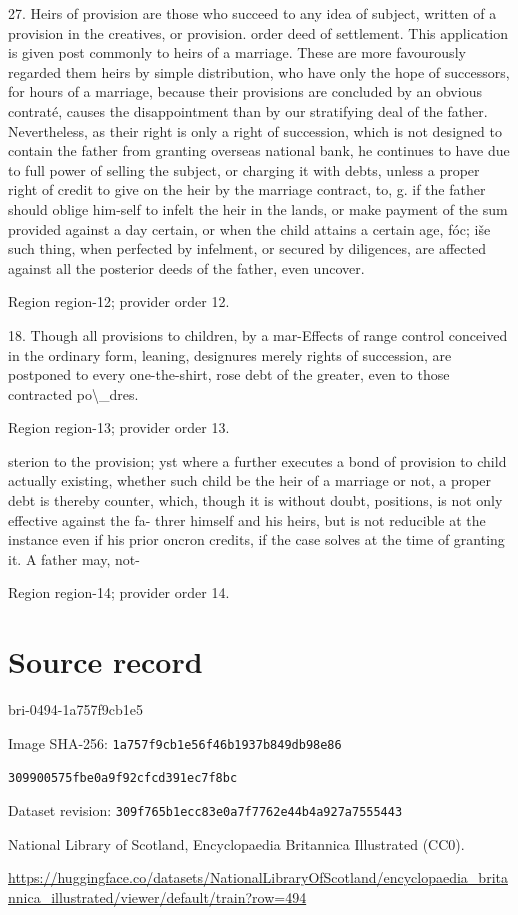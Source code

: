 \documentclass[11pt]{article}
\begin{document}
27. Heirs of provision are those who succeed to any idea of subject, written of a provision in the creatives, or provision. order deed of settlement. This application is given post commonly to heirs of a marriage. These are more favourously regarded them heirs by simple distribution, who have only the hope of successors, for hours of a marriage, because their provisions are concluded by an obvious contraté, causes the disappointment than by our stratifying deal of the father. Nevertheless, as their right is only a right of succession, which is not designed to contain the father from granting overseas national bank, he continues to have due to full power of selling the subject, or charging it with debts, unless a proper right of credit to give on the heir by the marriage contract, to, g. if the father should oblige him-self to infelt the heir in the lands, or make payment of the sum provided against a day certain, or when the child attains a certain age, fóc; iše such thing, when perfected by infelment, or secured by diligences, are affected against all the posterior deeds of the father, even uncover.
\par

{\scriptsize\color{gray} Region region-12; provider order 12.\par}
\medskip

18. Though all provisions to children, by a mar-Effects of range control conceived in the ordinary form, leaning, designures merely rights of succession, are postponed to every one-the-shirt, rose debt of the greater, even to those contracted po\textbackslash{}\_dres.
\par

{\scriptsize\color{gray} Region region-13; provider order 13.\par}
\medskip

sterion to the provision; yst where a further executes a bond of provision to child actually existing, whether such child be the heir of a marriage or not, a proper debt is thereby counter, which, though it is without doubt, positions, is not only effective against the fa- threr himself and his heirs, but is not reducible at the instance even if his prior oncron credits, if the case solves at the time of granting it. A father may, not-
\par

{\scriptsize\color{gray} Region region-14; provider order 14.\par}
\medskip
\newpage\section*{Source record}
bri-0494-1a757f9cb1e5\par
Image SHA-256: \texttt{1a757f9cb1e56f46b1937b849db98e86}\par\texttt{309900575fbe0a9f92cfcd391ec7f8bc}\par
Dataset revision: \texttt{309f765b1ecc83e0a7f7}\texttt{762e44b4a927a7555443}\par
National Library of Scotland, Encyclopaedia Britannica Illustrated (CC0).\par
\url{https://huggingface.co/datasets/NationalLibraryOfScotland/encyclopaedia_britannica_illustrated/viewer/default/train?row=494}
\end{document}
